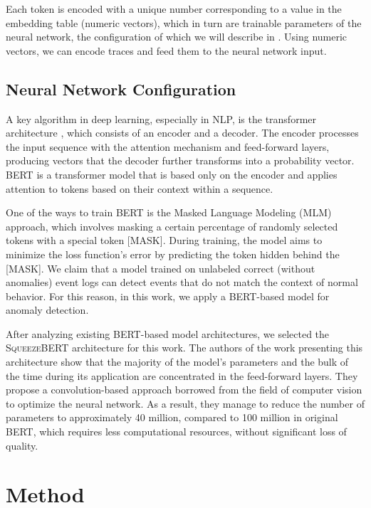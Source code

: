 \documentclass[sigplan,nonacm]{acmart}
\begin{document}
Each token is encoded with a unique number corresponding to a value in the embedding table (numeric vectors), which in turn are trainable parameters of the neural network, the configuration of which we will describe in . Using numeric vectors, we can encode traces and feed them to the neural network input.

\subsection{Neural Network Configuration}\label{sec:network}

A key algorithm in deep learning, especially in NLP, is the transformer architecture \cite{vaswani2017attention}, which consists of an encoder and a decoder. The encoder processes the input sequence with the attention mechanism and feed-forward layers, producing vectors that the decoder further transforms into a probability vector. \textsc{BERT} \cite{devlin2018bert} is a transformer model that is based only on the encoder and applies attention to tokens based on their context within a sequence.

One of the ways to train \textsc{BERT} is the Masked Language Modeling (MLM) approach, which involves masking a certain percentage of randomly selected tokens with a special token [MASK]. During training, the model aims to minimize the loss function's error by predicting the token hidden behind the [MASK]. We claim that a model trained on unlabeled correct (without anomalies) event logs can detect events that do not match the context of normal behavior. For this reason, in this work, we apply a BERT-based model for anomaly detection.

After analyzing existing BERT-based model architectures, we selected the \textsc{SqueezeBERT} architecture \cite{iandola2020squeezebert} for this work. The authors of the work presenting this architecture show that the majority of the model's parameters and the bulk of the time during its application are concentrated in the feed-forward layers. They propose a convolution-based approach borrowed from the field of computer vision to optimize the neural network. As a result, they manage to reduce the number of parameters to approximately 40 million, compared to 100 million in original \textsc{BERT}, which requires less computational resources, without significant loss of quality.


\section{Method}\label{sec:method}
\end{document}
